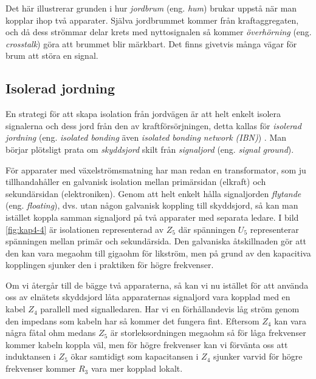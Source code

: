 Det här illustrerar grunden i hur \emph{jordbrum} (eng. \emph{hum}) brukar
uppstå när man kopplar ihop två apparater.
Själva jordbrummet kommer från kraftaggregaten, och då dess strömmar delar
krets med nyttosignalen så kommer \emph{överhörning} (eng. \emph{crosstalk})
göra att brummet blir märkbart.
Det finns givetvis många vägar för brum att störa en signal.

\subsection{Isolerad jordning}

En strategi för att skapa isolation från jordvägen är att helt enkelt
isolera signalerna och dess jord från den av kraftförsörjningen, detta kallas
för \emph{isolerad jordning} (eng. \emph{isolated bonding} även \emph{isolated
	bonding network (IBN)}) \cite[3.2.4]{K27-1991}.
Man börjar plötsligt prata om \emph{skyddsjord} skilt från \emph{signaljord}
(eng. \emph{signal ground}).

För apparater med växelströmsmatning har man redan en transformator, som ju
tillhandahåller en galvanisk isolation mellan primärsidan (elkraft) och
sekundärsidan (elektroniken).
Genom att helt enkelt hålla signaljorden \emph{flytande} (eng.
\emph{floating}), dvs. utan någon galvanisk koppling till skyddsjord, så kan
man istället koppla samman signaljord på två apparater med separata ledare.
I bild \ref{fig:kap4-4} är isolationen representerad av \(Z_5\) där spänningen
\(U_5\) representerar spänningen mellan primär och sekundärsida.
Den galvaniska åtskillnaden gör att den kan vara megaohm till gigaohm för
likström, men på grund av den kapacitiva kopplingen sjunker den i praktiken
för högre frekvenser.

Om vi återgår till de bägge två apparaterna, så kan vi nu istället för att
använda oss av elnätets skyddsjord låta apparaternas signaljord vara kopplad
med en kabel \(Z_4\) parallell med signalledaren.
Har vi en förhållandevis låg ström genom den impedans som kabeln har så
kommer det fungera fint.
Eftersom \(Z_4\) kan vara några fåtal ohm medans \(Z_5\) är storleksordningen
megaohm så för låga frekvenser kommer kabeln koppla väl, men för högre
frekvenser kan vi förvänta oss att induktansen i \(Z_5\) ökar samtidigt som
kapacitansen i \(Z_4\) sjunker varvid för högre frekvenser kommer \(R_3\) vara
mer kopplad lokalt.

